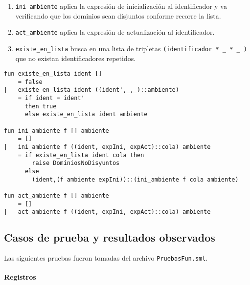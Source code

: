 \documentclass[12pt, times]{simauth}
\begin{document}
\begin{enumerate}
    \item \texttt{ini\_ambiente} aplica la expresión de inicialización al identificador y va verificando que los dominios sean disjuntos conforme recorre la lista.
    \item \texttt{act\_ambiente} aplica la expresión de actualización al identificador.
    \item \texttt{existe\_en\_lista} busca en una lista de tripletas \texttt{(identificador * \_ * \_ )} que no existan identificadores repetidos.
\end{enumerate}


\begin{verbatim}
fun existe_en_lista ident []
    = false
|   existe_en_lista ident ((ident',_,_)::ambiente)
    = if ident = ident' 
      then true
      else existe_en_lista ident ambiente

fun ini_ambiente f [] ambiente
    = []
|   ini_ambiente f ((ident, expIni, expAct)::cola) ambiente    
    = if existe_en_lista ident cola then
        raise DominiosNoDisyuntos
      else
        (ident,(f ambiente expIni))::(ini_ambiente f cola ambiente)

fun act_ambiente f [] ambiente
    = []
|   act_ambiente f ((ident, expIni, expAct)::cola) ambiente    
\end{verbatim}

\pagebreak
\subsection{Casos de prueba y resultados observados}

Las siguientes pruebas fueron tomadas del archivo \texttt{PruebasFun.sml}.

\paragraph{Registros}


\end{document}
